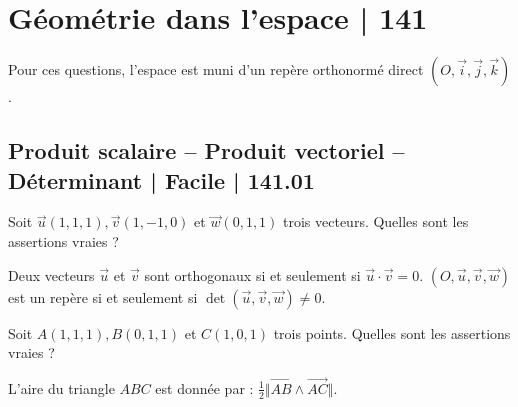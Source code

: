 

\section{Géométrie dans l'espace | 141}




Pour ces questions, l'espace est muni d'un repère orthonormé direct  $(O, \vec{i}, \vec{j}, \vec{k})$.

\subsection{Produit scalaire -- Produit vectoriel -- Déterminant | Facile | 141.01}

 
 
\begin{question} 
Soit $\vec{u}(1,1,1), \vec{v}(1,-1,0)$ et $\vec{w}(0,1,1)$ trois vecteurs. Quelles sont les assertions vraies ?
\begin{answers}



\end{answers}
\begin{explanations}
Deux vecteurs $\vec{u}$ et $\vec{v}$ sont orthogonaux si et seulement si $ \vec{u} \cdot \vec{v}=0$.
 $(O,\vec{u},\vec{v},\vec{w})$ est un repère si et seulement si $\det (\vec{u},\vec{v},\vec{w}) \neq 0$.
\end{explanations}

\end{question}


\begin{question} 
Soit $A(1,1,1), B(0,1,1)$ et $C(1,0,1)$ trois points. Quelles sont les assertions vraies ?
\begin{answers}



\end{answers}
\begin{explanations}
L'aire du triangle $ABC$ est donnée par : $\frac{1}{2} \Vert \overrightarrow{AB} \wedge \overrightarrow{AC} \Vert$. 
\end{explanations}

\end{question}




